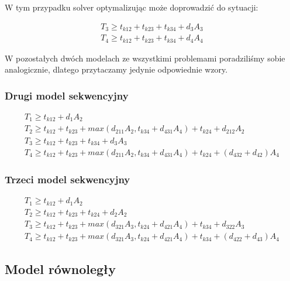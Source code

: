 W tym przypadku solver optymalizując może doprowadzić do sytuacji:

\begin{equation}
\begin{array}{l}
T_{3} \geq t_{k12} + t_{k23} + t_{k34} + d_{3}A_{3} \\
T_{4} \geq t_{k12} + t_{k23} + t_{k34} + d_{4}A_{4}
\end{array}
\end{equation}

W pozostałych dwóch modelach ze wszystkimi problemami poradziliśmy sobie analogicznie, dlatego przytaczamy jedynie odpowiednie wzory.

\subsubsection{Drugi model sekwencyjny}

\begin{equation} \label{eq:sek2}
\begin{array}{l}
T_{1} \geq t_{k12} + d_{1}A_{2} \\
T_{2} \geq t_{k12} + t_{k23} + max(d_{211}A_{2}, t_{k34} + d_{431}A_{4}) + t_{k24} + d_{212}A_{2} \\
T_{3} \geq t_{k12} + t_{k23} + t_{k34} + d_{3}A_{3} \\
T_{4} \geq t_{k12} + t_{k23} + max(d_{211}A_{2}, t_{k34} + d_{431}A_{4}) + t_{k24} + (d_{432} + d_{42})A_{4}
\end{array} 
\end{equation}

\subsubsection{Trzeci model sekwencyjny}

\begin{equation} \label{eq:sek3}
\begin{array}{l}
T_{1} \geq t_{k12} + d_{1}A_{2} \\
T_{2} \geq t_{k12} + t_{k23} + t_{k24} + d_{2}A_{2} \\
T_{3} \geq t_{k12} + t_{k23} + max(d_{321}A_{3}, t_{k24} + d_{421}A_{4}) + t_{k34} + d_{322}A_{3} \\
T_{4} \geq t_{k12} + t_{k23} + max(d_{321}A_{3}, t_{k24} + d_{421}A_{4}) + t_{k34} + (d_{422} + d_{43})A_{4}
\end{array}
\end{equation}

\subsection{Model równoległy}

